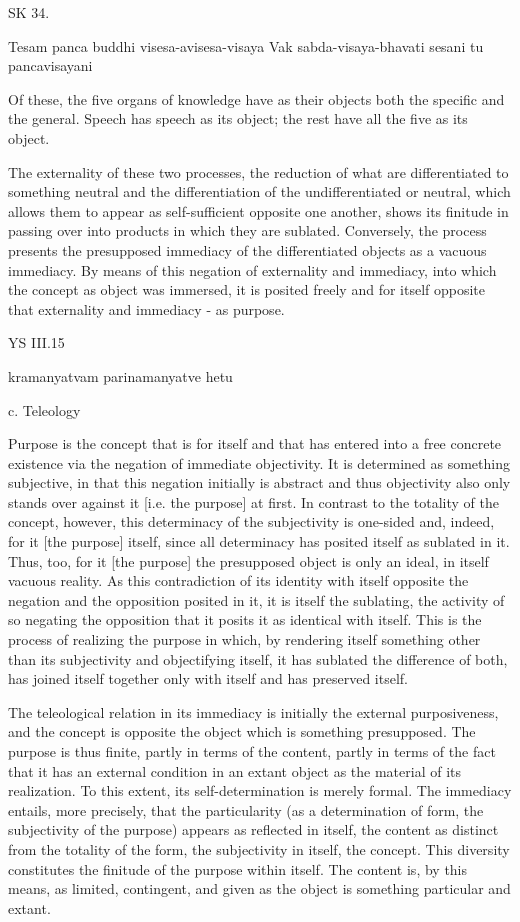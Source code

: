 SK 34.

Tesam panca buddhi visesa-avisesa-visaya
Vak sabda-visaya-bhavati sesani tu pancavisayani

Of these, the five organs of knowledge have as their objects
both the specific and the general.
Speech has speech as its object;
the rest have all the five as its object.

The externality of these two processes,
the reduction of what are differentiated to something neutral and
the differentiation of the undifferentiated or neutral,
which allows them to appear as self-sufficient opposite one another,
shows its finitude in passing over into products in which they are sublated.
Conversely, the process presents the presupposed immediacy
of the differentiated objects as a vacuous immediacy.
By means of this negation of externality and immediacy,
into which the concept as object was immersed,
it is posited freely and for itself opposite
that externality and immediacy - as purpose.

YS III.15

kramanyatvam parinamanyatve hetu

c. Teleology

Purpose is the concept that is for itself and that has entered into
a free concrete existence via the negation of immediate objectivity.
It is determined as something subjective, in that this negation
initially is abstract and thus objectivity also only stands
over against it [i.e. the purpose] at first.
In contrast to the totality of the concept, however,
this determinacy of the subjectivity is one-sided and, indeed,
for it [the purpose] itself, since all determinacy has posited
itself as sublated in it.
Thus, too, for it [the purpose] the presupposed object is
only an ideal, in itself vacuous reality.
As this contradiction of its identity with itself opposite the negation and the
opposition posited in it, it is itself the sublating, the activity of so negating
the opposition that it posits it as identical with itself.
This is the process of realizing the purpose in which,
by rendering itself something other than its subjectivity and
objectifying itself, it has sublated the difference of both,
has joined itself together only with itself and has preserved itself.

The teleological relation in its immediacy is initially the external purposiveness,
and the concept is opposite the object which is something presupposed.
The purpose is thus finite, partly in terms of the content,
partly in terms of the fact that it has an external condition
in an extant object as the material of its realization.
To this extent, its self-determination is merely formal.
The immediacy entails, more precisely, that the particularity
(as a determination of form, the subjectivity of the purpose)
appears as reflected in itself, the content as distinct from
the totality of the form, the subjectivity in itself, the concept.
This diversity constitutes the finitude of the purpose within itself.
The content is, by this means, as limited, contingent, and
given as the object is something particular and extant.

